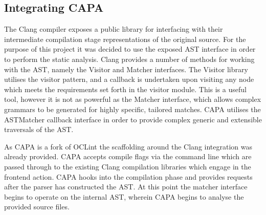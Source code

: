 \subsection{Integrating CAPA}\label{integrating_capa}
The Clang compiler exposes a public library for interfacing with their intermediate
compilation stage representations of the original source. For the purpose of this project it was
decided to use the exposed AST interface in order to perform the static analysis. Clang provides a
number of methods for working with the AST, namely the Visitor and Matcher interfaces. The Visitor
library utilises the visitor pattern, and a callback is undertaken upon visiting any node which
meets the requirements set forth in the visitor module. This is a useful tool, however it is not as
powerful as the Matcher interface, which allows complex grammars to be generated for highly
specific, tailored matches. CAPA utilises the ASTMatcher callback interface in order to provide complex
generic and extensible traversals of the AST. 


As CAPA is a fork of OCLint \cite{oclint} the scaffolding around the Clang integration was already
provided. CAPA accepts compile flags via the command line which are passed through to the existing
Clang compilation libraries which engage in the frontend action. CAPA hooks into the compilation
phase and provides requests after the parser has constructed the AST. At this point the matcher
interface begins to operate on the internal AST, wherein CAPA begins to analyse the provided source
files.



